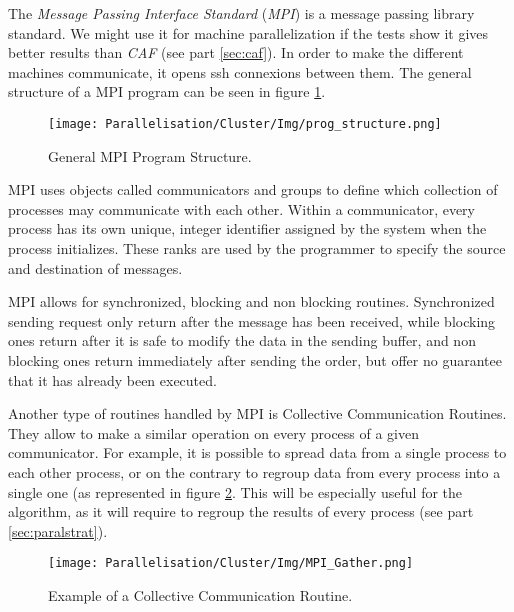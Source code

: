 The \emph{Message Passing Interface Standard} (\emph{MPI}) is a message passing library standard.
We might use it for machine parallelization if the tests show it gives better results than \emph{CAF} (see part \ref{sec:caf}).
In order to make the different machines communicate, it opens ssh connexions between them.
The general structure of a MPI program can be seen in figure \ref{fig:mpi_struct}.

\begin{figure}[H]
\centering
\texttt{[image: Parallelisation/Cluster/Img/prog\_structure.png]}
\caption{General MPI Program Structure. \cite{mpi_tuto}}
\label{fig:mpi_struct}
\end{figure}

MPI uses objects called communicators and groups to define which collection of processes may communicate with each other.
Within a communicator, every process has its own unique, integer identifier assigned by the system when the process initializes.
These ranks are used by the programmer to specify the source and destination of messages.

MPI allows for synchronized, blocking and non blocking routines.
Synchronized sending request only return after the message has been received, while blocking ones return after it is safe to modify the data in the sending buffer, and non blocking ones return immediately after sending the order, but offer no guarantee that it has already been executed.

Another type of routines handled by MPI is Collective Communication Routines.
They allow to make a similar operation on every process of a given communicator.
For example, it is possible to spread data from a single process to each other process, or on the contrary to regroup data from every process into a single one (as represented in figure \ref{fig:mpi_ccr}.
This will be especially useful for the algorithm, as it will require to regroup the results of every process (see part \ref{sec:paralstrat}).

\begin{figure}[H]
\centering
\texttt{[image: Parallelisation/Cluster/Img/MPI\_Gather.png]}
\caption{Example of a Collective Communication Routine. \cite{mpi_tuto}}
\label{fig:mpi_ccr}
\end{figure}
